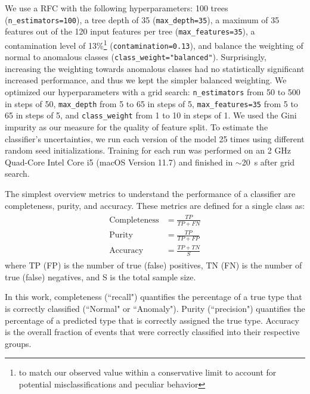 \documentclass[twocolumn]{aastex63}
\begin{document}
We use a RFC with the following hyperparameters: 100 trees (\texttt{n\_estimators=100}), a tree depth of 35 (\texttt{max\_depth=35}), a maximum of 35 features out of the 120 input features per tree (\texttt{max\_features=35}), a contamination level of 13\%\footnote{to match our observed value within a conservative limit to account for potential misclassifications and peculiar behavior} (\texttt{contamination=0.13}), and balance the weighting of normal to anomalous classes (\texttt{class\_weight="balanced"}). Surprisingly, increasing the weighting towards anomalous classes had no statistically significant increased performance, and thus we kept the simpler balanced weighting. We optimized our hyperparameters with a grid search: \texttt{n\_estimators} from 50 to 500 in steps of 50, \texttt{max\_depth} from 5 to 65 in steps of 5, \texttt{max\_features=35} from 5 to 65 in steps of 5, and \texttt{class\_weight} from 1 to 10 in steps of 1. We used the Gini impurity as our measure for the quality of feature split. %
To estimate the classifier's uncertainties, we run each version of the model 25 times using different random seed initializations. Training for each run was performed on an 2 GHz Quad-Core Intel Core i5 (macOS Version 11.7) and finished in $\sim$20~s after grid search. \par

The simplest overview metrics to understand the performance of a classifier are completeness, purity, and accuracy. These metrics are defined for a single class as:
\begin{align}
\label{eqn:metrics}
\begin{split}
 \text{Completeness} &= \frac{TP}{TP+FN}
\\
 \text{Purity} &= \frac{TP}{TP+FP}
\\
 \text{Accuracy} &= \frac{TP+TN}{S}
\end{split}
\end{align}
where TP (FP) is the number of true (false) positives, TN (FN) is the number of true (false) negatives, and S is the total sample size. \par

In this work, completeness (``recall") quantifies the percentage of a true type that is correctly classified (``Normal" or ``Anomaly"). Purity (``precision") quantifies the percentage of a predicted type that is correctly assigned the true type. Accuracy is the overall fraction of events that were correctly classified into their respective groups. \par %
\end{document}
